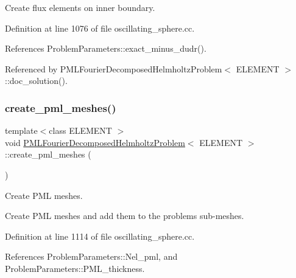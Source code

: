 Create flux elements on inner boundary. 



Definition at line 1076 of file oscillating\+\_\+sphere.\+cc.



References Problem\+Parameters\+::exact\+\_\+minus\+\_\+dudr().



Referenced by P\+M\+L\+Fourier\+Decomposed\+Helmholtz\+Problem$<$ E\+L\+E\+M\+E\+N\+T $>$\+::doc\+\_\+solution().

\mbox{\label{classPMLFourierDecomposedHelmholtzProblem_ae562dddf5c60793371b594bff5047f91}} 
\subsubsection{\texorpdfstring{create\+\_\+pml\+\_\+meshes()}{create\_pml\_meshes()}}
{\footnotesize\ttfamily template$<$class E\+L\+E\+M\+E\+NT $>$ \\
void \hyperlink{classPMLFourierDecomposedHelmholtzProblem}{P\+M\+L\+Fourier\+Decomposed\+Helmholtz\+Problem}$<$ E\+L\+E\+M\+E\+NT $>$\+::create\+\_\+pml\+\_\+meshes (\begin{DoxyParamCaption}{ }\end{DoxyParamCaption})}



Create P\+ML meshes. 

Create P\+ML meshes and add them to the problem\textquotesingle{}s sub-\/meshes. 

Definition at line 1114 of file oscillating\+\_\+sphere.\+cc.



References Problem\+Parameters\+::\+Nel\+\_\+pml, and Problem\+Parameters\+::\+P\+M\+L\+\_\+thickness.

\mbox{\label{classPMLFourierDecomposedHelmholtzProblem_a83e0aa333ec3b25f1afccc3bc0a529ad}} 
